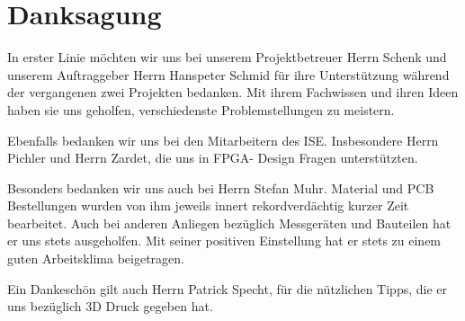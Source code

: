 \clearpage
\section{Danksagung}\label{sec:Danksagung}

In erster Linie möchten wir uns bei unserem Projektbetreuer Herrn Schenk und unserem Auftraggeber Herrn Hanspeter Schmid für ihre Unterstützung während der vergangenen zwei Projekten bedanken. Mit ihrem Fachwissen und ihren Ideen haben sie uns geholfen, verschiedenste Problemstellungen zu meistern. 

Ebenfalls bedanken wir uns bei den Mitarbeitern des ISE. Insbesondere Herrn Pichler und Herrn Zardet, die uns in FPGA- Design Fragen unterstützten.

Besonders bedanken wir uns auch bei Herrn Stefan Muhr. Material und PCB Bestellungen wurden von ihm jeweils innert rekordverdächtig kurzer Zeit bearbeitet. Auch bei anderen Anliegen bezüglich Messgeräten und Bauteilen hat er uns stets ausgeholfen. Mit seiner positiven Einstellung hat er stets zu einem guten Arbeitsklima beigetragen.  

Ein Dankeschön gilt auch Herrn Patrick Specht, für die nützlichen Tipps, die er uns bezüglich 3D Druck gegeben hat.




